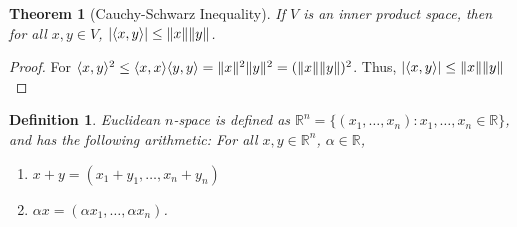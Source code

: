 \documentclass[oneside]{book}
\theoremstyle{mystyle}
\newtheorem{theorem}{Theorem}[section]
\newtheorem{definition}{Definition}[section]
\DeclarePairedDelimiter\norm{\lVert}{\rVert}
\begin{document}
\begin{theorem}[Cauchy-Schwarz Inequality]
If $V$ is an inner product space, then for all $x,y \in V$, $|\langle x,y\rangle| \leq \norm{x} \norm{y}$.
\end{theorem}
\begin{proof}
For $\langle x,y \rangle^2 \leq \langle x,x \rangle \langle y,y \rangle = \norm{x}^2 \norm{y}^2 = (\norm{x}\norm{y})^2$. Thus, $|\langle x,y \rangle| \leq \norm{x}\norm{y}$
\end{proof}

\begin{definition}
Euclidean $n$-space is defined as $\mathbb{R}^n=\{(x_1,\hdots, x_n):x_1,\hdots, x_n \in \mathbb{R}\}$, and has the following arithmetic: For all $x,y\in \mathbb{R}^n$, $\alpha \in \mathbb{R}$,
\begin{enumerate}
\item $x+y = (x_1+y_1,\hdots, x_n+y_n)$
\item $\alpha x = (\alpha x_1,\hdots, \alpha x_n)$.
\end{enumerate}
\end{definition}
\end{document}
